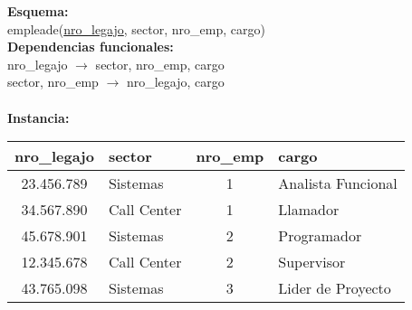 \documentclass[preview]{standalone}
\begin{document}
\textbf{Esquema:}\\
empleade(\underline{nro\_legajo}, sector, nro\_emp, cargo)\\

\textbf{Dependencias funcionales:}\\
nro\_legajo $\rightarrow$ sector, nro\_emp, cargo\\
sector, nro\_emp $\rightarrow$ nro\_legajo, cargo\\
{\color{red}{cargo $\rightarrow$ sector}}\\

\textbf{Instancia:}
\begin{center}
\scriptsize
\begin{tabular}{| c | l | c | l |}\hline			
	nro\_legajo & sector & nro\_emp & cargo  \\\hline			
	23.456.789 & Sistemas & 1 & Analista Funcional \\
	34.567.890 & Call Center & 1 & Llamador \\
	45.678.901 & Sistemas & 2 & Programador \\
	12.345.678 & Call Center & 2 & Supervisor \\
	43.765.098 & Sistemas & 3 & Lider de Proyecto \\\hline
\end{tabular}
\end{center}
\end{document}
